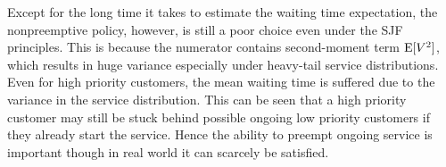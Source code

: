 \documentclass{article}
\begin{document}
Except for the long time it takes to estimate the waiting time expectation, the nonpreemptive policy, however, is still a poor choice even under the SJF principles. This is because the numerator contains second-moment term ${\rm E}[V^2]$, which results in huge variance especially under heavy-tail service distributions. Even for high priority customers, the mean waiting time is suffered due to the variance in the service distribution. This can be seen that a high priority customer may still be stuck behind possible ongoing low priority customers if they already start the service. Hence the ability to preempt ongoing service is important though in real world it can scarcely be satisfied. 










\end{document}
